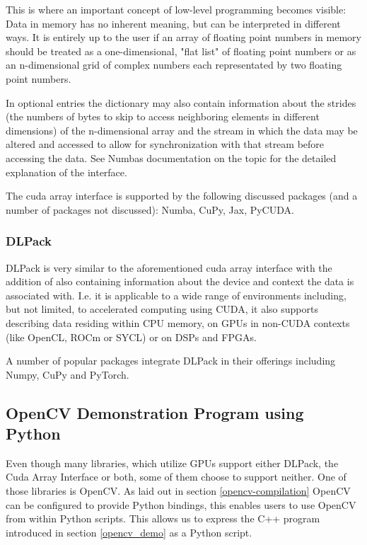 \documentclass[english,11pt,a4paper,table]{article} %
\begin{document}
This is where an important concept of low-level programming becomes visible: Data in memory has no inherent meaning, but can be interpreted in different ways. It is entirely up to the user if an array of floating point numbers in memory should be treated as a one-dimensional, "flat list" of floating point numbers or as an n-dimensional grid of complex numbers each representated by two floating point numbers.

In optional entries the dictionary may also contain information about the strides (the numbers of bytes to skip to access neighboring elements in different dimensions) of the n-dimensional array and the stream in which the data may be altered and accessed to allow for synchronization with that stream before accessing the data. See Numbas documentation on the topic \cite{CUDAArra5:online} for the detailed explanation of the interface.

The cuda array interface is supported by the following discussed packages (and a number of packages not discussed): Numba, CuPy, Jax, PyCUDA.
\subsubsection{DLPack}
DLPack is very similar to the aforementioned cuda array interface with the addition of also containing information about the device and context the data is associated with. I.e. it is applicable to a wide range of environments including, but not limited, to accelerated computing using CUDA, it also supports describing data residing within CPU memory, on GPUs in non-CUDA contexts (like OpenCL, ROCm or SYCL) or on DSPs and FPGAs.

A number of popular packages integrate DLPack in their offerings including Numpy, CuPy and PyTorch.

\subsection{OpenCV Demonstration Program using Python}
\label{opencv-demo-python}

Even though many libraries, which utilize GPUs support either DLPack, the Cuda Array Interface or both, some of them choose to support neither.
One of those libraries is OpenCV.
As laid out in section \ref{opencv-compilation} OpenCV can be configured to provide Python bindings, this enables users to use OpenCV from within Python scripts.
This allows us to express the C++ program introduced in section \ref{opencv_demo} as a Python script.
\end{document}
